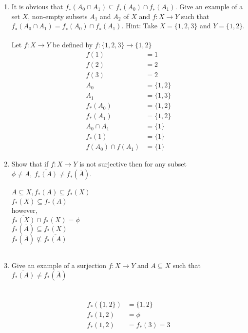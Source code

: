 \documentclass[11pt]{article}
\begin{document}
\begin{enumerate}
\begin{enumerate}
\item It is obvious that $f_∗(A_0 \cap A_1) \subseteq f_∗(A_0) \cap f_∗(A_1)$.  Give an
example of a set $X$, non-empty subsets $A_1$ and $A_2$ of $X$ and
$f : X \to Y$ such that $f_∗(A_0 \cap A_1) = f_∗(A_0) \cap f_∗(A_1)$. Hint:
Take $X = \{1, 2, 3\}$ and $Y = \{1, 2\}$.
\\ \\
Let $f: X \to Y$ be defined by $f: \{1,2,3\} \to \{1,2\}$
\begin{align*}
f(1) &= 1\\
f(2) &= 2\\
f(3) &= 2\\
A_0 &= \{1,2\}\\
A_1 &= \{1,3\}\\
f_*(A_0) &= \{1,2\}\\
f_*(A_1) &= \{1,2\}\\
A_0 \cap A_1 &= \{1\}\\
f_*(1) &= \{1\}\\
f(A_0) \cap f(A_1) &= \{1\}
\end{align*}
\item Show that if $f:X \to Y$ is not surjective then for any subset $\phi \neq A,\   \overline{f_∗(A)} \neq f_∗(\overline{A})$.\\
\\
$A \subseteq X, f_*(A) \subseteq f_*(X)$\\
$\overline{f_*(X)} \subseteq \overline{f_*(A)}$\\
however,\\
$\overline{f_*(X)} \cap f_*(X) = \phi$\\
$f_*(\overline{A}) \subseteq f_*(X)$\\
$f_*(\overline{A}) \nsubseteq \overline{f_*(A)}$\\
\\
\item Give an example of a surjection $f: X \to Y$ and $A \subseteq X$ such that $\overline{f_*(A)} \neq f_*(\overline{A})$\\
\\
\\
\begin{align*}
f_*(\{1,2\}) &= \{1,2\}\\
f_*(1,2) &= \phi\\
f_*(1,2) &= f_*(3) = 3
\end{align*}
\end{enumerate} %
\newpage


\end{enumerate}
\end{document}
